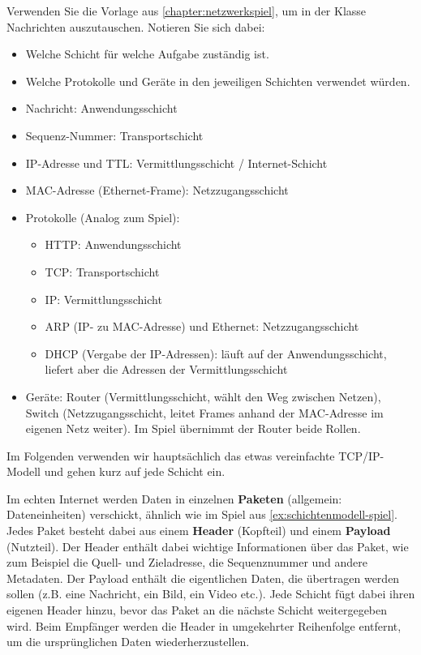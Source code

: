 \begin{myexercise}[Netzwerkspiel]\label{ex:schichtenmodell-spiel}
	Verwenden Sie die Vorlage aus \ref{chapter:netzwerkspiel}, um in der Klasse Nachrichten auszutauschen. Notieren Sie sich dabei:
	\begin{itemize}
		\item Welche Schicht für welche Aufgabe zuständig ist.
		\item Welche Protokolle und Geräte in den jeweiligen Schichten verwendet würden.
	\end{itemize}
	\begin{myanswer}
		\begin{itemize}
			\item Nachricht: Anwendungsschicht
			\item Sequenz-Nummer: Transportschicht
			\item \gls{IP}-Adresse und TTL: Vermittlungsschicht / Internet-Schicht
			\item \gls{MAC}-Adresse (Ethernet-Frame): Netzzugangsschicht
			\item Protokolle (Analog zum Spiel):
			      \begin{itemize}
				      \item \gls{HTTP}: Anwendungsschicht
				      \item \gls{TCP}: Transportschicht
				      \item \gls{IP}: Vermittlungsschicht
				      \item \gls{ARP} (\gls{IP}- zu \gls{MAC}-Adresse) und Ethernet: Netzzugangsschicht
				      \item \gls{DHCP} (Vergabe der \gls{IP}-Adressen): läuft auf der Anwendungsschicht, liefert aber die Adressen der Vermittlungsschicht
			      \end{itemize}
			\item Geräte: Router (Vermittlungsschicht, wählt den Weg zwischen Netzen), Switch (Netzzugangsschicht, leitet Frames anhand der \gls{MAC}-Adresse im eigenen Netz weiter). Im Spiel übernimmt der Router beide Rollen.
		\end{itemize}
	\end{myanswer}
\end{myexercise}

Im Folgenden verwenden wir hauptsächlich das etwas vereinfachte \acrshort{TCP}/\acrshort{IP}-Modell und gehen kurz auf jede Schicht ein.

Im echten Internet werden Daten in einzelnen \textbf{Paketen} (allgemein: Dateneinheiten) verschickt, ähnlich wie im Spiel aus \cref{ex:schichtenmodell-spiel}. Jedes Paket besteht dabei aus einem \textbf{Header} (Kopfteil) und einem \textbf{Payload} (Nutzteil). Der Header enthält dabei wichtige Informationen über das Paket, wie zum Beispiel die Quell- und Zieladresse, die Sequenznummer und andere Metadaten. Der Payload enthält die eigentlichen Daten, die übertragen werden sollen (z.B. eine Nachricht, ein Bild, ein Video etc.). Jede Schicht fügt dabei ihren eigenen Header hinzu, bevor das Paket an die nächste Schicht weitergegeben wird. Beim Empfänger werden die Header in umgekehrter Reihenfolge entfernt, um die ursprünglichen Daten wiederherzustellen.

